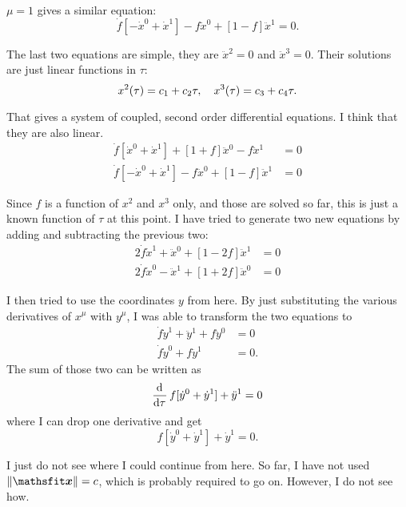 $\mu = 1$ gives a similar equation:
\[
    \dot f [-\dot x^0 + \dot x^1] - f \ddot x^0 + [1-f] \ddot x^1 = 0.
\]

The last two equations are simple, they are $\ddot x^2 = 0$ and $\ddot x^3 =
0$. Their solutions are just linear functions in $\tau$:
\[
    x^2(\tau) = c_1 + c_2 \tau
    ,\quad
    x^3(\tau) = c_3 + c_4 \tau.
\]

That gives a system of coupled, second order differential equations. I think
that they are also linear.
\begin{align*}
    \dot f [\dot x^0 + \dot x^1] + [1+f] \ddot x^0 - f \ddot x^1 &= 0 \\
    \dot f [-\dot x^0 + \dot x^1] - f \ddot x^0 + [1-f] \ddot x^1 &= 0
\end{align*}

Since $f$ is a function of $x^2$ and $x^3$ only, and those are solved so far,
this is just a known function of $\tau$ at this point. I have tried to generate
two new equations by adding and subtracting the previous two:
\begin{align*}
    2 \dot f \dot x^1 + \ddot x^0 + [1 - 2f] \ddot x^1 &= 0 \\
    2 \dot f \dot x^0 - \ddot x^1 + [1 + 2f] \ddot x^0 &= 0
\end{align*}

I then tried to use the coordinates $y$ from here. By just substituting the
various derivatives of $x^\mu$ with $y^\mu$, I was able to transform the two
equations to
\begin{align*}
    \dot f \dot y^1 + \ddot y^1 + f \ddot y^0 &= 0 \\
    \dot f \dot y^0 + f \ddot y^1 &= 0.
\end{align*}
The sum of those two can be written as
\[
    \dod{}\tau f [\dot y^0 + \dot y^1] + \ddot y^1 = 0
\]
where I can drop one derivative and get
\[
    f [\dot y^0 + \dot y^1] + \dot y^1 = 0.
\]

I just do not see where I could continue from here. So far, I have not used $\|
\tens x \| = c$, which is probably required to go on. However, I do not see
how.

\IfFileExists{\bibliographyfile}{
    \printbibliography
}{}




